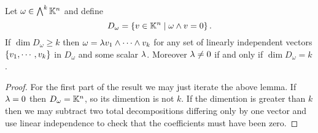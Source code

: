 \begin{corollary}\label{TotalDecomposibilityCriterion}
Let $\omega\in \bigwedge^k\mathbb{K}^n$ and define 
\[D_\omega=\left\{{v\in\mathbb{K}^n\mid \omega\wedge v=0}\right\}.\]
If $\dim D_\omega\geq k$ then $\omega=\lambda v_1\wedge \cdots\wedge v_k$ for any set of linearly independent vectors $\left\{{v_1,\cdots, v_k}\right\}$ in $D_\omega$ and some scalar $\lambda$. 
Moreover $\lambda\neq 0$ if and only if $\dim D_\omega= k$.
\end{corollary}
\begin{proof}
For the first part of the result we may just iterate the above lemma. If $\lambda=0$ then $D_\omega=\mathbb{K}^n$, so its dimention is not $k$. If the dimention is greater than $k$ then we may subtract two total decompositions differing only by one vector and use linear independence to check that the coefficients must have been zero.
\end{proof}


